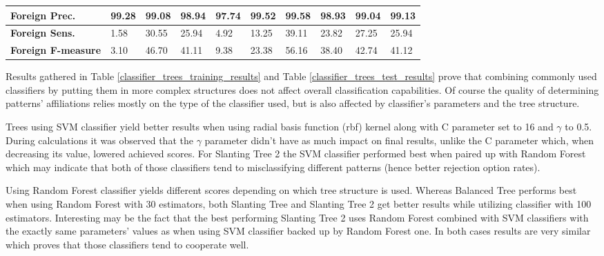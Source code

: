 \begin{table}[htp]
{\begin{tabular}{l|l|l|l|l|l|l|l|l|l|}
			\multicolumn{1}{|l|}{\textbf{Foreign Prec.}}         & 99.28         & 99.08         & 98.94       & 97.74         & 99.52         & 99.58       & 98.93          & 99.04         & 99.13        \\ \hline
			\multicolumn{1}{|l|}{\textbf{Foreign Sens.}}       & 1.58          & 30.55         & 25.94       & 4.92          & 13.25         & 39.11       & 23.82          & 27.25         & 25.94        \\ \hline
			\multicolumn{1}{|l|}{\textbf{Foreign F-measure}}         & 3.10          & 46.70         & 41.11       & 9.38          & 23.38         & 56.16       & 38.40          & 42.74         & 41.12        \\ \hline
		\end{tabular}
	}
\end{table}

Results gathered in Table \ref{classifier_trees_training_results} and Table \ref{classifier_trees_test_results} prove that combining commonly used classifiers by putting them in more complex structures does not affect overall classification capabilities. Of course the quality of determining patterns' affiliations relies mostly on the type of the classifier used, but is also affected by classifier's parameters and the tree structure. 

Trees using SVM classifier yield better results when using radial basis function (rbf) kernel along with C parameter set to 16 and $\gamma$ to 0.5. During calculations it was observed that the $\gamma$ parameter didn't have as much impact on final results, unlike the C parameter which, when decreasing its value, lowered achieved scores. For Slanting Tree 2 the SVM classifier performed best when paired up with Random Forest which may indicate that both of those classifiers tend to misclassifying different patterns (hence better rejection option rates).

Using Random Forest classifier yields different scores depending on which tree structure is used. Whereas Balanced Tree performs best when using Random Forest with 30 estimators, both Slanting Tree and Slanting Tree 2 get better results while utilizing classifier with 100 estimators. Interesting may be the fact that the best performing Slanting Tree 2 uses Random Forest combined with SVM classifiers with the exactly same parameters' values as when using SVM classifier backed up by Random Forest one. In both cases results are very similar which proves that those classifiers tend to cooperate well.

